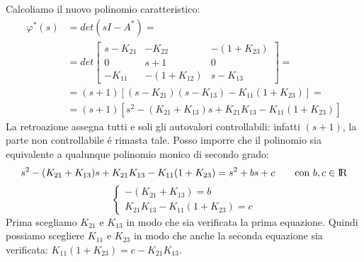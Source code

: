 \begin{mdframed}[style=Exercise]
\begin{Exercise}[title={Studio completo del sistema e stabilizzazione}, difficulty=3]
				Calcoliamo il nuovo polinomio caratteristico:
				\begin{align*}
					\varphi^{*}(s) &= det(sI-A^{*}) =\\
					&= det
					\begin{bmatrix}
						s-K_{21} & -K_{22} & -(1+K_{23})\\
						0 & s+1 & 0\\
						-K_{11} & -(1+K_{12}) & s-K_{13}
					\end{bmatrix} =\\
					&= (s+1)\left[ (s-K_{21})(s-K_{13}) - K_{11}(1+K_{23}) \right] =\\ 
					&= (s+1)\left[ s^2 - (K_{21}+K_{13})s + K_{21}K_{13} - K_{11}(1+K_{23}) \right]
				\end{align*}
				La retroazione assegna tutti e soli gli autovalori controllabili: infatti $ (s+1) $, la parte non controllabile \'e rimasta tale. Posso imporre che il polinomio sia equivalente a qualunque polinomio monico di secondo grado:
				\[ s^2 - (K_{21}+K_{13})s + K_{21}K_{13} - K_{11}(1+K_{23}) = s^2 + bs + c \qquad \text{con}\ b,c \in \rm I\!R \]
				\[
					\begin{cases}
						-(K_{21} + K_{13}) = b\\
						K_{21} K_{13} - K_{11}(1+K_{23}) = c
					\end{cases}
				\]
				Prima scegliamo $ K_{21} $ e $ K_{13} $ in modo che sia verificata la prima equazione. Quindi possiamo scegliere $ K_{11} $ e $ K_{23} $ in modo che anche la seconda equazione sia verificata: $ K_{11}(1+K_{23}) = c - K_{21}K_{13} $.
		\end{Exercise}
	\end{mdframed}
